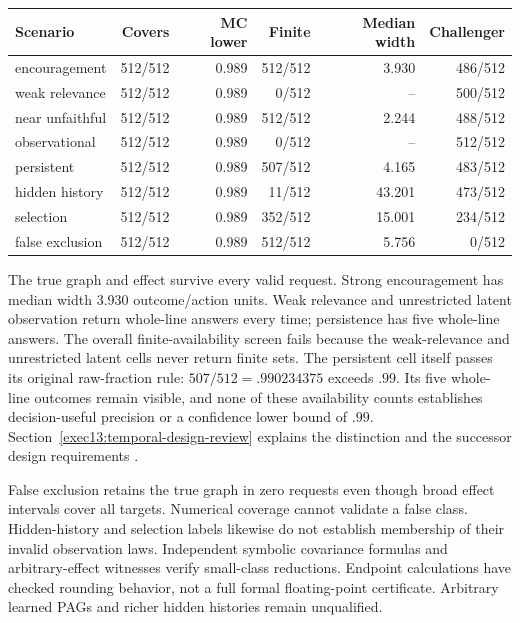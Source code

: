 \begin{center}\footnotesize\begin{tabular}{lrrrrr}\toprule
Scenario & Covers & MC lower & Finite & Median width & Challenger\\
\midrule
encouragement & 512/512 & 0.989 & 512/512 & 3.930 & 486/512 \\
weak relevance & 512/512 & 0.989 & 0/512 & -- & 500/512 \\
near unfaithful & 512/512 & 0.989 & 512/512 & 2.244 & 488/512 \\
observational & 512/512 & 0.989 & 0/512 & -- & 512/512 \\
persistent & 512/512 & 0.989 & 507/512 & 4.165 & 483/512 \\
hidden history & 512/512 & 0.989 & 11/512 & 43.201 & 473/512 \\
selection & 512/512 & 0.989 & 352/512 & 15.001 & 234/512 \\
false exclusion & 512/512 & 0.989 & 512/512 & 5.756 & 0/512 \\
\bottomrule\end{tabular}\end{center}


The true graph and effect survive every valid request. Strong encouragement has median width 3.930 outcome/action units. Weak relevance and unrestricted latent observation return whole-line answers every time; persistence has five whole-line answers. The overall finite-availability screen fails because the weak-relevance and unrestricted latent cells never return finite sets. The persistent cell itself passes its original raw-fraction rule: $507/512=.990234375$ exceeds $.99$. Its five whole-line outcomes remain visible, and none of these availability counts establishes decision-useful precision or a confidence lower bound of $.99$. Section~\ref{exec13:temporal-design-review} explains the distinction and the successor design requirements \citep{exec13_temporal_design}.

False exclusion retains the true graph in zero requests even though broad effect intervals cover all targets. Numerical coverage cannot validate a false class. Hidden-history and selection labels likewise do not establish membership of their invalid observation laws. Independent symbolic covariance formulas and arbitrary-effect witnesses verify small-class reductions. Endpoint calculations have checked rounding behavior, not a full formal floating-point certificate. Arbitrary learned PAGs and richer hidden histories remain unqualified.

